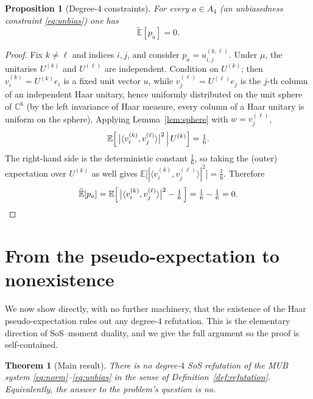 \documentclass{amsart}
\newtheorem{theorem}{Theorem}
\newtheorem{proposition}{Proposition}
\theoremstyle{definition}
\theoremstyle{remark}
\begin{document}
\begin{proposition}[Degree-$4$ constraints]\label{prop:deg4}
For every $a\in A_4$ (an unbiasedness constraint \eqref{eq:unbias}) one has
\[
\widetilde{\mathbb{E}}[p_a]=0 .
\]
\end{proposition}

\begin{proof}
Fix $k\ne\ell$ and indices $i,j$, and consider $p_a=u^{(k,\ell)}_{i,j}$. Under $\mu$, the
unitaries $U^{(k)}$ and $U^{(\ell)}$ are independent. Condition on $U^{(k)}$; then
$v^{(k)}_i=U^{(k)}e_i$ is a fixed unit vector $u$, while $v^{(\ell)}_j=U^{(\ell)}e_j$ is the
$j$-th column of an independent Haar unitary, hence uniformly distributed on the unit sphere of
$\mathbb{C}^6$ (by the left invariance of Haar measure, every column of a Haar unitary is
uniform on the sphere). Applying Lemma~\ref{lem:sphere} with $w=v^{(\ell)}_j$,
\[
\mathbb{E}\Bigl[\,\bigl|\langle v^{(k)}_i,v^{(\ell)}_j\rangle\bigr|^2 \,\Big|\, U^{(k)}\Bigr]
=\tfrac16 .
\]
The right-hand side is the deterministic constant $\tfrac16$, so taking the (outer)
expectation over $U^{(k)}$ as well gives
$\mathbb{E}\bigl[|\langle v^{(k)}_i,v^{(\ell)}_j\rangle|^2\bigr]=\tfrac16$. Therefore
\[
\widetilde{\mathbb{E}}[p_a]
=\mathbb{E}\Bigl[\,\bigl|\langle v^{(k)}_i,v^{(\ell)}_j\rangle\bigr|^2-\tfrac16\,\Bigr]
=\tfrac16-\tfrac16=0 . \qedhere
\]
\end{proof}

\section{From the pseudo-expectation to nonexistence}\label{sec:duality}

We now show directly, with no further machinery, that the existence of the Haar
pseudo-expectation rules out any degree-$4$ refutation. This is the elementary direction of
SoS--moment duality, and we give the full argument so the proof is self-contained.

\begin{theorem}[Main result]\label{thm:main}
There is no degree-$4$ SoS refutation of the MUB system \eqref{eq:norm}--\eqref{eq:unbias} in
the sense of Definition~\ref{def:refutation}. Equivalently, the answer to the problem's
question is \emph{no}.
\end{theorem}
\end{document}
